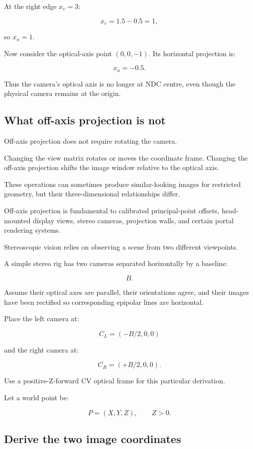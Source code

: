 At the right edge \(x_v=3\):

\[ x_c=1.5-0.5=1, \]

so \(x_n=1\).

Now consider the optical-axis point \((0,0,-1)\). Its horizontal projection is:

\[ x_n=-0.5. \]

Thus the camera's optical axis is no longer at NDC centre, even though the physical camera remains at the origin.

\subsection{What off-axis projection is not}\label{02-foundations-ii-ch035-what-off-axis-projection-is-not}

Off-axis projection does not require rotating the camera.

Changing the view matrix rotates or moves the coordinate frame. Changing the off-axis projection shifts the image window relative to the optical axis.

These operations can sometimes produce similar-looking images for restricted geometry, but their three-dimensional relationships differ.

Off-axis projection is fundamental to calibrated principal-point offsets, head-mounted display views, stereo cameras, projection walls, and certain portal rendering systems.

Stereoscopic vision relies on observing a scene from two different viewpoints.

A simple stereo rig has two cameras separated horizontally by a baseline:

\[ \boxed{B}. \]

Assume their optical axes are parallel, their orientations agree, and their images have been rectified so corresponding epipolar lines are horizontal.

Place the left camera at:

\[ C_L=(-B/2,0,0) \]

and the right camera at:

\[ C_R=(+B/2,0,0). \]

Use a positive-Z-forward CV optical frame for this particular derivation.

Let a world point be:

\[ P=(X,Y,Z),\qquad Z>0. \]

\subsection{Derive the two image coordinates}\label{02-foundations-ii-ch035-derive-the-two-image-coordinates}

